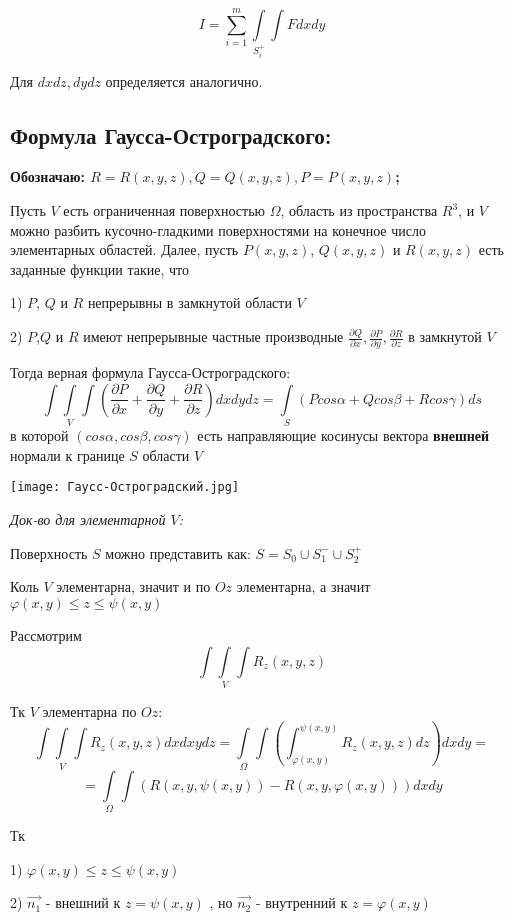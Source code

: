 \documentclass[12pt]{article}
\begin{document}
$$
I
=
\sum_{i = 1}^{m} \int\limits_{S_i^+}\int F dxdy 
$$

Для $dxdz , dydz$ определяется аналогично. 


\newpage
\subsection{Формула Гаусса-Остроградского:}
\textbf{Обозначаю: $R = R(x, y ,z) , Q = Q(x,y,z) , P = P(x,y,z)$;}

		Пусть $V$ есть ограниченная поверхностью $\Omega$, область из пространства $R^3$, и $V$ можно разбить кусочно-гладкими поверхностями на конечное число элементарных областей. Далее, пусть $P(x, y ,z)$, $Q(x, y ,z)$ и $R(x,y,z)$ есть заданные функции
такие, что 

1)  $P$, $Q$ и $R$ непрерывны в замкнутой области $V$


2) $P$,$Q$ и $R$ имеют непрерывные частные производные $\frac{\partial Q}{\partial x},\frac{\partial P}{\partial y},
\frac{\partial R}{\partial z} $ в замкнутой $V$

Тогда верная формула Гаусса-Остроградского:
$$
\int\int\limits_{V}\int (\frac{\partial P}{\partial x} + \frac{\partial Q}{\partial y} + \frac{\partial R}{\partial z})dxdydz
=
\int\limits_{S} (Pcos\alpha + Qcos\beta + Rcos\gamma)ds
$$
в которой $(cos\alpha, cos\beta, cos\gamma)$ есть направляющие косинусы вектора \textbf{внешней} нормали к границе $S$ области $V$

\texttt{[image: Гаусс-Остроградский.jpg]}

\textit{Док-во для элементарной $V$:}

	Поверхность $S$ можно представить как:
	$S = S_0 \cup S_1^- \cup S_2^+$

	Коль $V$ элементарна, значит и по $Oz$ элементарна, а значит
	$\varphi(x,y) \leq z \leq \psi(x,y)$
	


	Рассмотрим 
	$$\int\int\limits_{V}\int R_z(x,y,z)$$



Тк $V$ элементарна по $Oz$: 
$$
\int\int\limits_{V}\int R_z(x,y,z) dxdxydz
=
\int\limits_{\Omega}\int(\int_{\varphi(x,y)}^{\psi(x,y)} R_z(x,y,z)dz) dxdy
=
$$
$$
=
\int\limits_{\Omega}\int (R(x,y,\psi(x,y)) - R(x,y,\varphi(x,y)))dxdy
$$

Тк 

1)	$\varphi(x,y) \leq z \leq \psi(x,y)$ 

2) $\vec{n_1}$ - внешний к $z = \psi(x,y)$ , но $\vec{n_2}$ - внутренний к $z = \varphi(x,y)$ 
\end{document}
